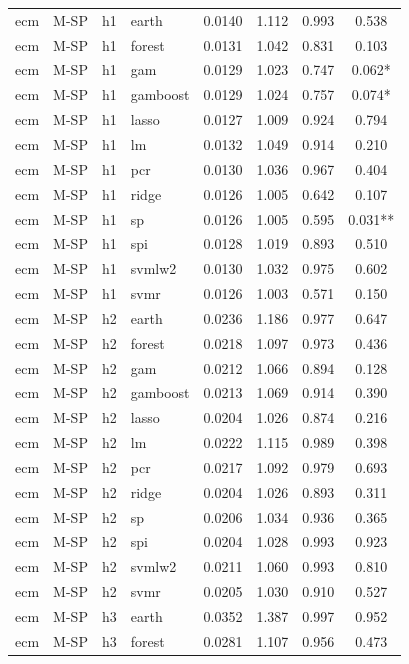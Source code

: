 \begin{ThreePartTable}
\begin{longtable}[t]{llclcccc}
\addlinespace
ecm & M-SP & h1 & earth & 0.0140 & 1.112 & 0.993 & 0.538\\
ecm & M-SP & h1 & forest & 0.0131 & 1.042 & 0.831 & 0.103\\
ecm & M-SP & h1 & gam & 0.0129 & 1.023 & 0.747 & 0.062*\\
ecm & M-SP & h1 & gamboost & 0.0129 & 1.024 & 0.757 & 0.074*\\
ecm & M-SP & h1 & lasso & 0.0127 & 1.009 & 0.924 & 0.794\\
ecm & M-SP & h1 & lm & 0.0132 & 1.049 & 0.914 & 0.210\\
ecm & M-SP & h1 & pcr & 0.0130 & 1.036 & 0.967 & 0.404\\
ecm & M-SP & h1 & ridge & 0.0126 & 1.005 & 0.642 & 0.107\\
ecm & M-SP & h1 & sp & 0.0126 & 1.005 & 0.595 & 0.031**\\
ecm & M-SP & h1 & spi & 0.0128 & 1.019 & 0.893 & 0.510\\
ecm & M-SP & h1 & svmlw2 & 0.0130 & 1.032 & 0.975 & 0.602\\
ecm & M-SP & h1 & svmr & 0.0126 & 1.003 & 0.571 & 0.150\\
\addlinespace
ecm & M-SP & h2 & earth & 0.0236 & 1.186 & 0.977 & 0.647\\
ecm & M-SP & h2 & forest & 0.0218 & 1.097 & 0.973 & 0.436\\
ecm & M-SP & h2 & gam & 0.0212 & 1.066 & 0.894 & 0.128\\
ecm & M-SP & h2 & gamboost & 0.0213 & 1.069 & 0.914 & 0.390\\
ecm & M-SP & h2 & lasso & 0.0204 & 1.026 & 0.874 & 0.216\\
ecm & M-SP & h2 & lm & 0.0222 & 1.115 & 0.989 & 0.398\\
ecm & M-SP & h2 & pcr & 0.0217 & 1.092 & 0.979 & 0.693\\
ecm & M-SP & h2 & ridge & 0.0204 & 1.026 & 0.893 & 0.311\\
ecm & M-SP & h2 & sp & 0.0206 & 1.034 & 0.936 & 0.365\\
ecm & M-SP & h2 & spi & 0.0204 & 1.028 & 0.993 & 0.923\\
ecm & M-SP & h2 & svmlw2 & 0.0211 & 1.060 & 0.993 & 0.810\\
ecm & M-SP & h2 & svmr & 0.0205 & 1.030 & 0.910 & 0.527\\
\addlinespace
ecm & M-SP & h3 & earth & 0.0352 & 1.387 & 0.997 & 0.952\\
ecm & M-SP & h3 & forest & 0.0281 & 1.107 & 0.956 & 0.473\\

\end{longtable}
\end{ThreePartTable}
